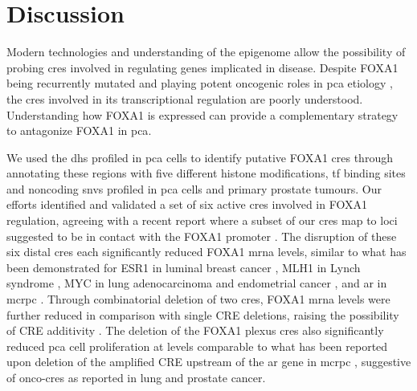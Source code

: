 \section{Discussion}

Modern technologies and understanding of the epigenome allow the possibility of probing \glspl{cre} involved in regulating genes implicated in disease.
Despite FOXA1 being recurrently mutated \cite{abeshouseMolecularTaxonomyPrimary2015,fraserGenomicHallmarksLocalized2017,barbieriExomeSequencingIdentifies2012,grassoMutationalLandscapeLethal2012,robinsonIntegrativeClinicalGenomics2015} and playing potent oncogenic roles in \gls{pca} etiology \cite{paroliaDistinctStructuralClasses2019,adamsFOXA1MutationsAlter2019,gaoForkheadDomainMutations2019}, the \glspl{cre} involved in its transcriptional regulation are poorly understood.
Understanding how FOXA1 is expressed can provide a complementary strategy to antagonize FOXA1 in \gls{pca}.

We used the \gls{dhs} profiled in \gls{pca} cells to identify putative FOXA1 \glspl{cre} through annotating these regions with five different histone modifications, \gls{tf} binding sites and noncoding \glspl{snv} profiled in \gls{pca} cells and primary prostate tumours.
Our efforts identified and validated a set of six active \glspl{cre} involved in FOXA1 regulation, agreeing with a recent report where a subset of our \glspl{cre} map to loci suggested to be in contact with the FOXA1 promoter \cite{rhieHighresolution3DEpigenomic2019}.
The disruption of these six distal \glspl{cre} each significantly reduced FOXA1 \gls{mrna} levels, similar to what has been demonstrated for ESR1 in luminal breast cancer \cite{baileyNoncodingSomaticInherited2016}, MLH1 in Lynch syndrome \cite{liuDisruption35Kb2018}, MYC in lung adenocarcinoma and endometrial cancer \cite{zhangIdentificationFocallyAmplified2016}, and \gls{ar} in \gls{mcrpc} \cite{takedaSomaticallyAcquiredEnhancer2018,viswanathanStructuralAlterationsDriving2018}.
Through combinatorial deletion of two \glspl{cre}, FOXA1 \gls{mrna} levels were further reduced in comparison with single CRE deletions, raising the possibility of CRE additivity \cite{osterwalderEnhancerRedundancyProvides2018}.
The deletion of the FOXA1 plexus \glspl{cre} also significantly reduced \gls{pca} cell proliferation at levels comparable to what has been reported upon deletion of the amplified CRE upstream of the \gls{ar} gene in \gls{mcrpc} \cite{takedaSomaticallyAcquiredEnhancer2018}, suggestive of onco-\glspl{cre} as reported in lung \cite{zhangIdentificationFocallyAmplified2016} and prostate \cite{takedaSomaticallyAcquiredEnhancer2018} cancer.

